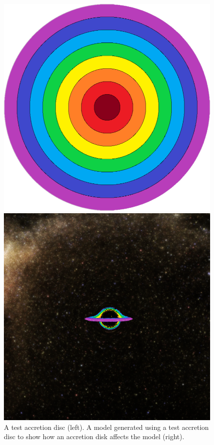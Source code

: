 \documentclass[oneside,openright,frontopenright, singlespacing]{dmathesis}
\begin{document}
\vspace{1em}
\begin{figure}[!ht]
	\centering
	\begin{minipage}{0.5\textwidth}
		\centering
		\includegraphics[width=0.9\linewidth]{img/test-accretion}
	\end{minipage}%
	\hfill
	\begin{minipage}{0.5\textwidth}
		\centering
		\includegraphics[width=0.9\linewidth]{img/milky-way-hdri-accretion(1)}
	\end{minipage}
	\caption{A test accretion disc (left). A model generated using a test accretion disc to show how an accretion disk affects the model (right).}
	\label{fig:Figure5.1}
\end{figure}
\end{document}

